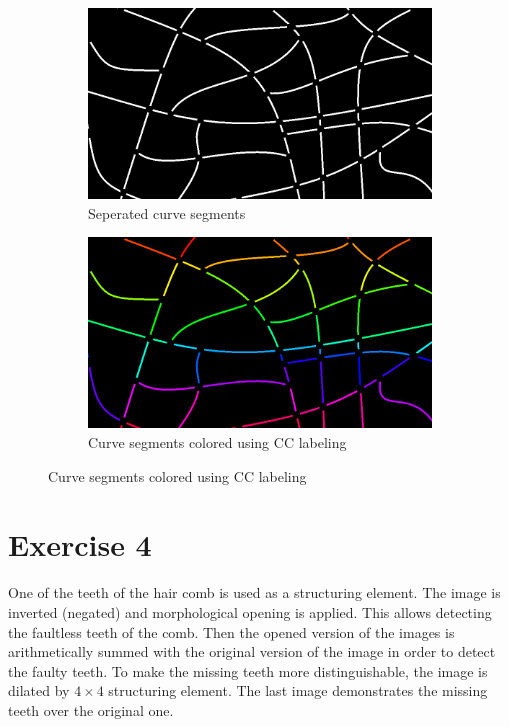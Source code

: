 \documentclass[a4paper]{article}
\begin{document}
\begin{figure}[htp]
\centering
\begin{subfigure}{.5\textwidth}
  \centering
  \includegraphics[width=.9\linewidth]{ex3.3}
  \caption{Seperated curve segments}
  \label{fig:sub1}
\end{subfigure}%
\begin{subfigure}{.5\textwidth}
  \centering
  \includegraphics[width=.9\linewidth]{ex3.4}
  \caption{Curve segments colored using CC labeling}
  \label{fig:sub2}
\end{subfigure}
\captionsetup{format=empty}
\label{fig:test}
\end{figure}



\newpage
\section*{Exercise 4}
\label{sec:org8afe074}

One of the teeth of the hair comb is used as a structuring element. The image is inverted (negated) and morphological opening is applied. This allows detecting the faultless teeth of the comb. Then the opened version of the images is arithmetically summed with the original version of the image in order to detect the faulty teeth. To make the missing teeth more distinguishable, the image is dilated by \(4 \times 4\) structuring element. The last image demonstrates the missing teeth over the original one.
\end{document}
